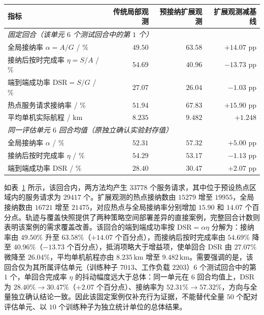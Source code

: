 \begin{table}[!htbp]
    \centering
    \label{tab:ch3-trajectory}
    \footnotesize
    \setlength{\tabcolsep}{6pt}
    \begin{tabular}{lrrr}
        \toprule
        指标 & 传统局部观测 & 预接纳扩展观测 & 扩展观测减基线 \\
        \midrule
        \multicolumn{4}{l}{\textit{固定回合（该单元 $6$ 个测试回合中的第 $1$ 个）}} \\
        \quad 全局接纳率 $\alpha = A/G$ / $\%$ & $49.50$ & $63.58$ & $+14.07$ pp \\
        \quad 接纳后按时完成率 $\eta = S/A$ / $\%$ & $54.69$ & $40.96$ & $-13.73$ pp \\
        \quad 端到端成功率 $\mathrm{DSR} = S/G$ / $\%$ & $27.07$ & $26.04$ & $-1.03$ pp \\
        \quad 热点服务请求接纳率 / $\%$ & $51.94$ & $67.83$ & $+15.90$ pp \\
        \quad 平均单机实际航程 / $\mathrm{km}$ & $8.235$ & $9.482$ & $+1.248$ \\
        \midrule
        \multicolumn{4}{l}{\textit{同一评估单元 $6$ 回合均值（原独立确认实验封存值）}} \\
        \quad 全局接纳率 $\alpha$ / $\%$ & $52.31$ & $57.32$ & $+5.00$ pp \\
        \quad 接纳后按时完成率 $\eta$ / $\%$ & $54.29$ & $53.17$ & $-1.13$ pp \\
        \quad 端到端成功率 $\mathrm{DSR}$ / $\%$ & $28.40$ & $30.47$ & $+2.07$ pp \\
        \bottomrule
    \end{tabular}
\end{table}

如表~\ref{tab:ch3-trajectory} 所示，该回合内，两方法均产生 $33778$ 个服务请求，其中位于预设热点区域内的服务请求为 $29417$ 个。扩展观测的热点接纳数由 $15279$ 增至 $19955$，全局接纳数由 $16721$ 增至 $21475$，对应热点与全局接纳率分别增加 $15.90$ 和 $14.07$ 个百分点。轨迹与覆盖快照提供了两种策略空间部署差异的直接案例，完整回合计数则表明该案例的需求覆盖改善。该回合的端到端成功率按 $\mathrm{DSR} = \alpha\eta$ 分解为：接纳率由 $49.50\%$ 升至 $63.58\%$（$+14.07$ 个百分点），而接纳后按时完成率由 $54.69\%$ 降至 $40.96\%$（$-13.73$ 个百分点），抵消项略大于增益项，使单回合 DSR 由 $27.07\%$ 微降至 $26.04\%$，平均单机航程亦由 $8.235\,\mathrm{km}$ 增至 $9.482\,\mathrm{km}$。需要强调的是，该回合仅为其所属评估单元（训练种子 $7013$、工作负载 $2203$）$6$ 个测试回合中的第 $1$ 个，单回合完成率 $\eta$ 的抖动幅度远大于总体：同一单元在 $6$ 回合均值上，DSR 为 $28.40\%\to30.47\%$（$+2.07$ 个百分点）、接纳率为 $52.31\%\to57.32\%$，方向与全量独立确认结论一致。因此该固定案例仅补充行为证据，不能替代全量 $50$ 个配对评估单元、以 $10$ 个训练种子为独立统计单位的总体结果。

